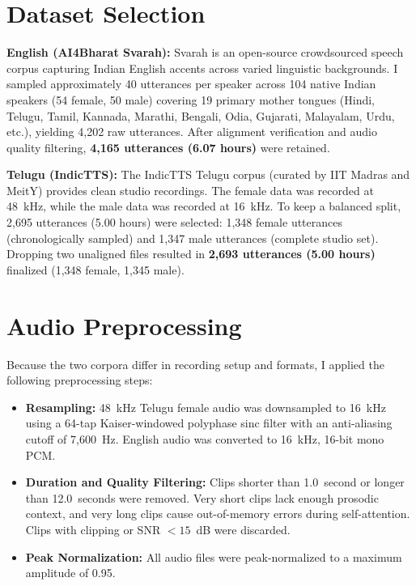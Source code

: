 \documentclass[11pt,a4paper]{report}
\begin{document}
\section{Dataset Selection}
\textbf{English (AI4Bharat Svarah):} Svarah is an open-source crowdsourced speech corpus capturing Indian English accents across varied linguistic backgrounds. I sampled approximately 40 utterances per speaker across 104 native Indian speakers (54 female, 50 male) covering 19 primary mother tongues (Hindi, Telugu, Tamil, Kannada, Marathi, Bengali, Odia, Gujarati, Malayalam, Urdu, etc.), yielding 4{,}202 raw utterances. After alignment verification and audio quality filtering, \textbf{4{,}165 utterances (6.07 hours)} were retained.

\textbf{Telugu (IndicTTS):} The IndicTTS Telugu corpus (curated by IIT Madras and MeitY) provides clean studio recordings. The female data was recorded at 48~kHz, while the male data was recorded at 16~kHz. To keep a balanced split, 2{,}695 utterances (5.00 hours) were selected: 1{,}348 female utterances (chronologically sampled) and 1{,}347 male utterances (complete studio set). Dropping two unaligned files resulted in \textbf{2{,}693 utterances (5.00 hours)} finalized (1{,}348 female, 1{,}345 male).

\section{Audio Preprocessing}
Because the two corpora differ in recording setup and formats, I applied the following preprocessing steps:
\begin{itemize}
    \item \textbf{Resampling:} 48~kHz Telugu female audio was downsampled to 16~kHz using a 64-tap Kaiser-windowed polyphase sinc filter with an anti-aliasing cutoff of 7{,}600~Hz. English audio was converted to 16~kHz, 16-bit mono PCM.
    \item \textbf{Duration and Quality Filtering:} Clips shorter than 1.0~second or longer than 12.0~seconds were removed. Very short clips lack enough prosodic context, and very long clips cause out-of-memory errors during self-attention. Clips with clipping or SNR $<15$~dB were discarded.
    \item \textbf{Peak Normalization:} All audio files were peak-normalized to a maximum amplitude of 0.95.
\end{itemize}
\end{document}
